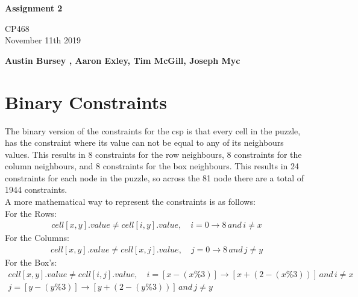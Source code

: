\documentclass{article}
\begin{document}
\begin{titlepage}
  \pagestyle{fancy}
  \thispagestyle{fancy}
   \begin{center}
       \vspace*{1cm}
 
      \Huge
       \textbf{Assignment 2}
 
       \vspace{0.5cm}
       \Large
        CP468 \\ November 11th 2019
 
       \vspace{1.5cm}
 
       \textbf{Austin Bursey , Aaron Exley, Tim McGill, Joseph Myc}
 
       \vfill

       \vspace{0.8cm}
 
   \end{center}
\end{titlepage}
\setcounter{page}{2}

\section{Binary Constraints}
The binary version of the constraints for the csp is that every cell in the puzzle, has the constraint where its value can not be equal to any of its neighbours  values. This results in 8 constraints for the row neighbours, 8 constraints for the column neighbours, and 8 constraints for the box neighbours. This results in 24 constraints for each node in the puzzle, so across the 81 node there are a total of 1944 constraints.\\
\newline
A more mathematical way to represent the constraints is as follows:\\
For the Rows:
\begin{align*}
cell[x, y].value \ne cell[i, y].value,\quad i=0\rightarrow8\,and\, i \ne x
\end{align*}
For the Columns:
\begin{align*}
cell[x, y].value \ne cell[x, j].value,\quad j=0\rightarrow8\,and\, j \ne y
\end{align*}
For the Box's:
\begin{align*}
cell[x, y].value \ne cell[i, j].value,\quad i=[x-(x\%3)]\rightarrow[x+(2-(x\%3))]\,and\, i \ne x \\
												j=[y-(y\%3)]\rightarrow[y+(2-(y\%3))]\, and\, j \ne y
\end{align*}
\end{document}
